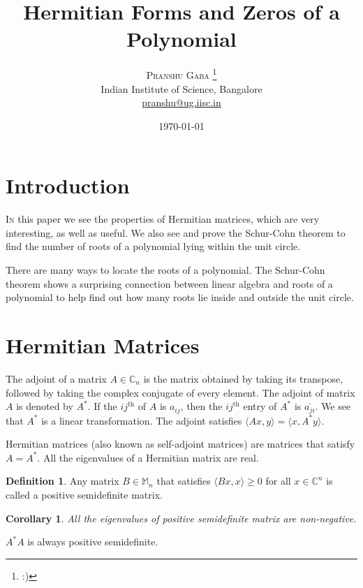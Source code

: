\documentclass[twofold, twocolumn]{article}
\author{%
\textsc{Pranshu Gaba} \thanks{:)} \\[1ex]
\normalsize Indian Institute of Science, Bangalore \\
\normalsize \href{mailto:pranshu@ug.iisc.in}{pranshu@ug.iisc.in}}
\title{Hermitian Forms and Zeros of a Polynomial}
\date{\today}
\newcommand*\conj[1]{\overline{#1}}
\newcommand*\adj[1]{#1^*}
\theoremstyle{plain}
\newtheorem*{corollary}{Corollary}
\theoremstyle{definition}
\newtheorem*{definition}{Definition}
\begin{document}
\maketitle

\section{Introduction}

\lettrine[nindent=0em,lines=2]{I}n this paper we see the properties of Hermitian matrices, which are very interesting, as well as useful. We also see and prove the Schur-Cohn theorem to find the number of roots of a polynomial lying within the unit circle. 

There are many ways to locate the roots of a polynomial. The Schur-Cohn theorem shows a surprising connection between linear algebra and roots of a polynomial to help find out how many roots lie inside and outside the unit circle.


\section{Hermitian Matrices}

The adjoint of a matrix \(A \in \mathbb{C}_n\) is the matrix obtained by taking its transpose, followed by taking the complex conjugate of every element. The adjoint of matrix \(A\) is denoted by \(\adj{A}\). If the \(ij^{\text{th}} \) of \(A\) is \(a_{ij}\), then the \(ij^{\text{th}}\) entry of \(\adj{A}\) is \(\conj{a_{ji}}\). We see that \(\adj{A}\) is a linear transformation. The adjoint satisfies \(\langle Ax, y \rangle = \langle x, \adj{A}y \rangle\). 

Hermitian matrices (also known as self-adjoint matrices) are matrices that satisfy \(A = \adj{A}\). All the eigenvalues of a Hermitian matrix are real. 

\begin{definition} Any matrix \(B \in \mathbb{M}_n\) that satisfies \(\langle Bx, x\rangle \ge 0\) for all \(x \in \mathbb{C}^n\) is called a positive semidefinite matrix. \end{definition}

\begin{corollary}All the eigenvalues of positive semidefinite matrix are non-negative. \end{corollary}




\(\adj{A} A\) is always positive semidefinite. 
\end{document}
